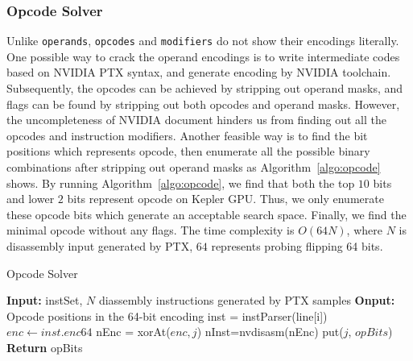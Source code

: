 \subsubsection{Opcode Solver}
Unlike {\tt operands}, {\tt opcodes} and {\tt modifiers} do not show their encodings literally. One possible way to crack the operand 
encodings is to write intermediate codes
based on NVIDIA PTX syntax, and generate encoding by NVIDIA toolchain.
Subsequently, the opcodes can be achieved by stripping out operand masks, and
flags can be found by stripping out both opcodes and operand masks.
However, the uncompleteness of NVIDIA document hinders us from finding out all the opcodes and instruction modifiers. 
Another feasible way is to find the bit positions which represents opcode, then
enumerate all the possible binary combinations after stripping out operand masks as Algorithm~\ref{algo:opcode} shows.
By running Algorithm~\ref{algo:opcode}, we find that both the top $10$ bits and lower $2$ bits represent opcode on Kepler GPU.
Thus, we only enumerate these opcode bits which generate an acceptable search space. Finally, we find 
the minimal opcode without any flags. The time complexity is $O(64N)$, where $N$
is disassembly input generated by PTX, $64$ represents probing flipping 64
bits.

\begin{algorithm}[htbp]
      \caption{Opcode Solver}\label{algo:opcode}
      {\small
      \begin{algorithmic}[1]
      \State \textbf {Input:} instSet, $N$ diassembly instructions generated by PTX samples
      \State \textbf {Onput:} Opcode positions in the 64-bit encoding
      \State inst = instParser(line[i])
      \State $enc \gets inst.enc64$
      \State nEnc = xorAt($enc, j$)
      \State nInst=nvdisasm(nEnc)
      \State put($j$, $opBits$)
      \EndIf
      \EndFor
      \EndFor
      \State \textbf{Return} opBits %
  \end{algorithmic}
  }
\end{algorithm}

